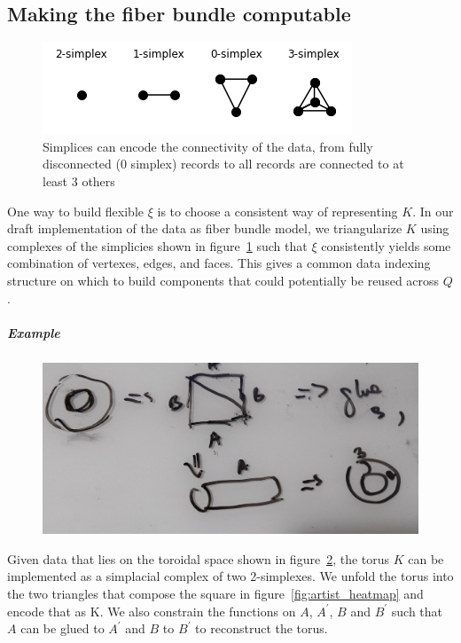 \documentclass[../main.tex]{subfiles}
\begin{document}
\subsection{Making the fiber bundle computable}
\label{sec:triangulization}

\begin{figure}[ht!]
    \includegraphics{figures/math/simplex.png}
    \caption{Simplices can encode the connectivity of the data, from fully disconnected (0 simplex) records to all records are connected to at least 3 others}
    \label{fig:triangle_simplex}
\end{figure}

One way to build flexible $\xi$ is to choose a consistent way of representing $K$. In our draft implementation of the data as fiber bundle model, we triangularize $K$ using complexes of the simplicies shown in figure~\ref{fig:triangle_simplex} such that $\xi$ consistently yields some combination of vertexes, edges, and faces. This gives a common data indexing structure on which to build components that could potentially be reused across $Q$.

\subparagraph{Example}
\begin{figure}[ht!]
    \includegraphics[width=\textwidth]{figures/math/triangle_torus.png}
    \label{fig:triangle_torus}
\end{figure}

Given data that lies on the toroidal space shown in figure~\ref{fig:triangle_torus}, the torus $K$ can be implemented as a simplacial complex of two 2-simplexes. We unfold the torus into the two triangles that compose the square in figure~\ref{fig:artist_heatmap} and encode that as K. We also constrain the functions on $A$, $A^\prime$, $B$ and $B^\prime$ such that $A$ can be glued to $A^\prime$ and $B$ to $B^\prime$ to reconstruct the torus. 
\end{document}
